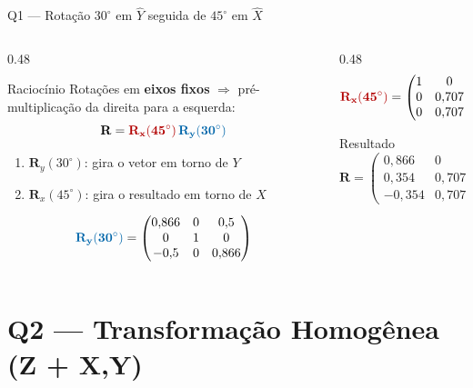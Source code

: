 \documentclass[aspectratio=169,12pt]{beamer}
\newcommand{\Rx}[1]{\mathbf{R}_x(#1)}
\newcommand{\Ry}[1]{\mathbf{R}_y(#1)}
\newcommand{\degr}{^{\circ}}
\newcommand{\mat}[1]{\begin{pmatrix}#1\end{pmatrix}}
\newcommand{\hlred}[1]{\textcolor{red!70!black}{\mathbf{#1}}}
\newcommand{\hlblue}[1]{\textcolor{ufamlightblue}{\mathbf{#1}}}
\begin{document}
\begin{frame}{Q1 --- Rotação $30\degr$ em $\hat{Y}$ seguida de $45\degr$ em $\hat{X}$}
  \begin{columns}
    \begin{column}{0.48\textwidth}
      \begin{block}{Raciocínio}
        Rotações em \textbf{eixos fixos} $\Rightarrow$ pré-multiplicação da direita para a esquerda:
        \[
          \mathbf{R} = \hlred{\Rx{45\degr}}\,\hlblue{\Ry{30\degr}}
        \]
        \begin{enumerate}
          \item[$1^\circ$] $\Ry{30\degr}$: gira o vetor em torno de $Y$
          \item[$2^\circ$] $\Rx{45\degr}$: gira o resultado em torno de $X$
        \end{enumerate}
      \end{block}
      \vspace{0.3cm}
      \[
        \hlblue{\Ry{30\degr}} = \mat{0{,}866&0&0{,}5\\0&1&0\\-0{,}5&0&0{,}866}
      \]
    \end{column}
    \begin{column}{0.48\textwidth}
      \[
        \hlred{\Rx{45\degr}} = \mat{1&0&0\\0&0{,}707&-0{,}707\\0&0{,}707&0{,}707}
      \]
      \begin{exampleblock}{Resultado}
        \[
          \mathbf{R} = \mat{
            0{,}866 & 0 & 0{,}500\\
            0{,}354 & 0{,}707 & -0{,}612\\
           -0{,}354 & 0{,}707 &  0{,}612}
        \]
      \end{exampleblock}
    \end{column}
  \end{columns}
\end{frame}

\section{Q2 --- Transformação Homogênea (Z + X,Y)}
\end{document}
